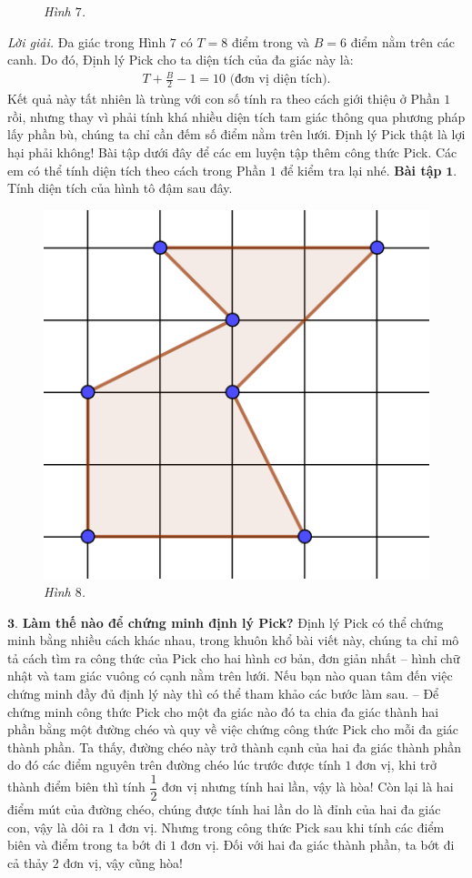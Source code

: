 \begin{multicols}{2}
\begin{figure}[H]
		\caption{\small\textit{\color{toancuabi}Hình $7$.}}
		\vspace*{-10pt}
	\end{figure}
	\textit{Lời giải.}	Đa giác trong Hình $7$ có $T = 8$ điểm trong và $B = 6$ điểm nằm trên các canh. Do đó, Định lý Pick cho ta diện tích của đa giác này là:
	\begin{align*}
		T + \frac{B}{2} - 1 = 10 \text{ (đơn vị diện tích).}
	\end{align*}
	Kết quả này tất nhiên là trùng với con số tính ra theo cách giới thiệu ở Phần $1$ rồi, nhưng thay vì phải tính khá nhiều diện tích tam giác thông qua phương pháp lấy phần bù, chúng ta chỉ cần đếm số điểm nằm trên lưới. Định lý Pick thật là lợi hại phải không!
	\vskip 0.1cm
	Bài tập dưới đây để các em luyện tập thêm công thức Pick. Các em có thể tính diện tích theo cách trong Phần $1$ để kiểm tra lại nhé.
	\vskip 0.1cm
	\textbf{\color{toancuabi}Bài tập} $\pmb{1.}$ Tính diện tích của hình tô đậm sau đây.
	\begin{figure}[H]
		\vspace*{-5pt}
		\centering
		\captionsetup{labelformat= empty, justification=centering}
		\includegraphics[width= 0.35\linewidth]{8}
		\caption{\small\textit{\color{toancuabi}Hình $8$.}}
		\vspace*{-5pt}
	\end{figure}
	$\pmb{3.}$ \textbf{\color{toancuabi}Làm thế nào để chứng minh định lý Pick?}
	\vskip 0.1cm
	Định lý Pick có thể chứng minh bằng nhiều cách khác nhau, trong khuôn khổ bài viết này, chúng ta chỉ mô tả cách tìm ra công thức của Pick cho hai hình cơ bản, đơn giản nhất -- hình chữ nhật và tam giác vuông có cạnh nằm trên lưới.
	\vskip 0.1cm 
	Nếu bạn nào quan tâm đến việc chứng minh đầy đủ định lý này thì có thể tham khảo các bước làm sau.
	\vskip 0.1cm
	-- Để chứng minh công thức Pick cho một đa giác nào đó ta chia đa giác thành hai phần bằng một đường chéo và quy về việc chứng công thức Pick cho mỗi đa giác thành phần. Ta thấy, đường chéo này trở thành cạnh của hai đa giác thành phần do đó các điểm nguyên trên đường chéo lúc trước được tính $1$ đơn vị, khi trở thành điểm biên thì tính $\dfrac{1}{2}$ đơn vị nhưng tính hai lần, vậy là hòa! Còn lại là hai điểm mút của đường chéo, chúng được tính hai lần do là đỉnh của hai đa giác con, vậy là dôi ra $1$ đơn vị. Nhưng trong công thức Pick sau khi tính các điểm biên và điểm trong ta bớt đi $1$ đơn vị. Đối với hai đa giác thành phần, ta bớt đi cả thảy $2$ đơn vị, vậy cũng hòa! 

\end{multicols}
